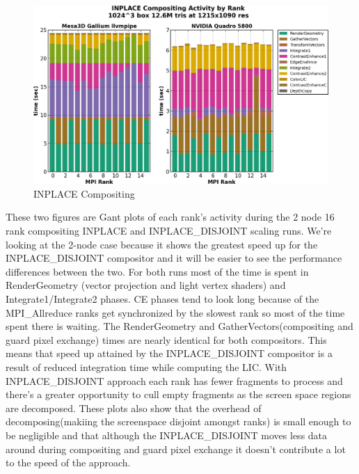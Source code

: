 \documentclass[a4paper,10pt]{article}
\begin{document}
\begin{figure}[h]
 \centering
 \includegraphics[width=1.1\textwidth]{./scaling-gant-inplace-composite-gpu-mesa.png}
 \caption{INPLACE Compositing}
 \label{fig:inplace-comp}
\end{figure}


These two figures are Gant plots of each rank's activity during the 2 node 16 rank compositing INPLACE and INPLACE\_DISJOINT scaling runs. We're looking at the 2-node case because it shows the greatest speed up for the INPLACE\_DISJOINT compositor and it will be easier to see the performance differences between the two. For both runs most of the time is spent in RenderGeometry (vector projection and light vertex shaders) and Integrate1/Integrate2 phases. CE phases tend to look long because of the MPI\_Allreduce ranks get synchronized by the slowest rank so most of the time spent there is waiting. The RenderGeometry and GatherVectors(compositing and guard pixel exchange) times are nearly identical for both compositors. This means that speed up attained by the INPLACE\_DISJOINT compositor is a result of reduced integration time while computing the LIC. With INPLACE\_DISJOINT approach each rank has fewer fragments to process and there's a greater opportunity to cull empty fragments as the screen space regions are decomposed. These plots also show that the overhead of decomposing(makiing the screenspace disjoint amongst ranks) is small enough to be negligible and that although the INPLACE\_DISJOINT moves less data around during compositing and guard pixel exchange it doesn't contribute a lot to the speed of the approach.
\end{document}

